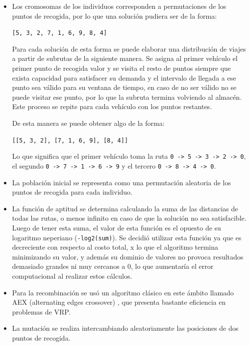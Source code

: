 \documentclass[12pt]{llncs}
\begin{document}
\begin{itemize}
    \item Los cromosomas de los individuos corresponden a permutaciones de los puntos de recogida, por lo que una solución pudiera ser de la forma:

    \verb+[5, 3, 2, 7, 1, 6, 9, 8, 4]+

    Para cada solución de esta forma se puede elaborar una distribución de viajes a partir de subrutas de la siguiente manera. Se asigna al primer vehículo el primer punto de recogida valor y se visita el resto de puntos siempre que exista capacidad para satisfacer su demanda y el intervalo de llegada a ese punto sea válido para su ventana de tiempo, en caso de no ser válido no se puede visitar ese punto, por lo que la subruta termina volviendo al almacén. Este proceso se repite para cada vehículo con los puntos restantes.

    De esta manera se puede obtener algo de la forma:

    \verb+[[5, 3, 2], [7, 1, 6, 9], [8, 4]]+

    Lo que significa que el primer vehículo toma la ruta \verb+0 -> 5 -> 3 -> 2 -> 0+, el segundo \verb+0 -> 7 -> 1 -> 6 -> 9+ y el tercero \verb+0 -> 8 -> 4 -> 0+.

    \item La población inicial se representa como una permutación aleatoria de los puntos de recogida para cada individuo.

    \item La función de aptitud se determina calculando la suma de las distancias de todas las rutas, o menos infinito en caso de que la solución no sea satisfacible. Luego de tener esta suma, el valor de esta función es el opuesto de su logaritmo neperiano (\verb+-log2(sum)+). Se decidió utilizar esta función ya que es decreciente con respecto al costo total, x lo que el algoritmo termina minimizando su valor, y además su dominio de valores no provoca resultados demasiado grandes ni muy cercanos a 0, lo que aumentaría el error computacional al realizar estos cálculos.
    
    \item Para la recombinación se usó un algoritmo clásico en este ámbito llamado AEX (alternating edges crossover) \cite{puljic2013comparison}, que presenta bastante eficiencia en problemas de VRP.
    
    \item La mutación se realiza intercambiando aleatoriamente las posiciones de dos puntos de recogida.
\end{itemize}
\end{document}
